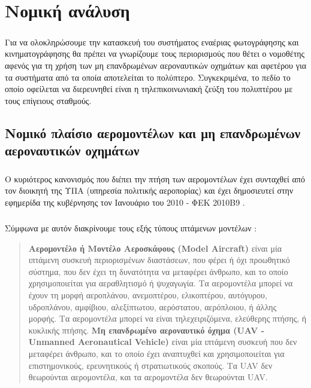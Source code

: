 \documentclass[a4paper, 12pt, twoside]{report}
\begin{document}
{{{{{{	\chapter{Νομική ανάλυση}
		
		\paragraph{}{Για να ολοκληρώσουμε την κατασκευή του συστήματος εναέριας φωτογράφησης και κινηματογράφησης θα πρέπει να γνωρίζουμε τους περιορισμούς που θέτει ο νομοθέτης αφενός για τη χρήση των μη επανδρωμένων αεροναυτικών οχημάτων και αφετέρου για τα συστήματα από τα οποία αποτελείται το πολύπτερο. Συγκεκριμένα, το πεδίο το οποίο οφείλεται να διερευνηθεί είναι η τηλεπικοινωνιακή ζεύξη του πολυπτέρου με τους επίγειους σταθμούς. 
			}
			
		\section{Νομικό πλαίσιο αερομοντέλων και μη επανδρωμένων αεροναυτικών οχημάτων}
			
			\paragraph{}{Ο κυριότερος κανονισμός που διέπει την πτήση των αερομοντέλων έχει συνταχθεί από τον διοικητή της ΥΠΑ (υπηρεσία πολιτικής αεροπορίας) και έχει δημοσιευτεί στην εφημερίδα της κυβέρνησης τον Ιανουάριο του 2010 - ΦΕΚ 2010Β9 \cite{ΦΕΚ2010Β9}.
			}
			\paragraph{}{Σύμφωνα με αυτόν διακρίνουμε τους εξής τύπους ιπτάμενων μοντέλων :
			\begin{quote}
				\textbf{Αερομοντέλο ή Μοντέλο Αεροσκάφους (Model Aircraft)} είναι μία ιπτάμενη συσκευή περιορισμένων διαστάσεων, που φέρει ή όχι προωθητικό σύστημα, που δεν έχει τη δυνατότητα να μεταφέρει άνθρωπο, και το οποίο χρησιμοποιείται για αεραθλητισμό ή ψυχαγωγία. Τα αερομοντέλα μπορεί να έχουν τη μορφή αεροπλάνου, ανεμοπτέρου, ελικοπτέρου, αυτόγυρου, υδροπλάνου, αμφίβιου, αλεξίπτωτου, αερόστατου, αερόπλοιου, ή άλλης μορφής. Τα αερομοντέλα μπορεί να είναι τηλεχειριζόμενα, ελεύθερης πτήσης, ή κυκλικής πτήσης.\linebreak
				\textbf{Μη επανδρωμένο αεροναυτικό όχημα (UAV - Unmanned Aeronautical Vehicle)} είναι μία ιπτάμενη συσκευή που δεν μεταφέρει άνθρωπο, και το οποίο έχει αναπτυχθεί και χρησιμοποιείται για επιστημονικούς, ερευνητικούς ή στρατιωτικούς σκοπούς. Τα UAV δεν θεωρούνται αερομοντέλα, και τα αερομοντέλα δεν θεωρούνται UAV.			
			\end{quote}
			}
}}}}}}
\end{document}
